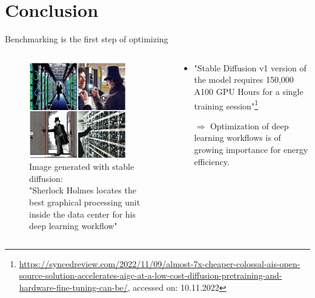 \documentclass[compress,aspectratio=169]{beamer}
\begin{document}
\section{Conclusion}
\begin{frame}{Benchmarking is the first step of optimizing}
\label{pg:lastpage} %

\begin{columns}
        \begin{column}{0.5\textwidth}
            \centering
            \vspace{-1em}
            \begin{figure}
            \includegraphics[width=0.85\textwidth]{assets/Sherlock-Holmes-locates-the-best-graphical-processing-unit-inside-the-data-center-for-his-deep-learning-workflow}
            \caption*{Image generated with stable diffusion: \\
            \tiny{"Sherlock Holmes locates the best graphical processing unit inside the data center for his deep learning workflow"}}
            \end{figure}
        \end{column}
        \begin{column}{0.5\textwidth}
            \begin{itemize}
                \item "Stable Diffusion v1 version of the model requires 150,000 A100 GPU Hours for a single training session"\footnote{\tiny{\url{https://syncedreview.com/2022/11/09/almost-7x-cheaper-colossal-ais-open-source-solution-accelerates-aigc-at-a-low-cost-diffusion-pretraining-and-hardware-fine-tuning-can-be/}}, accessed on: 10.11.2022}
                \vspace{1em}
                \item[$\Rightarrow$] Optimization of deep learning workflows is of growing importance for energy efficiency.
            \end{itemize}
        \end{column}
    \end{columns}

\end{frame}
\end{document}

